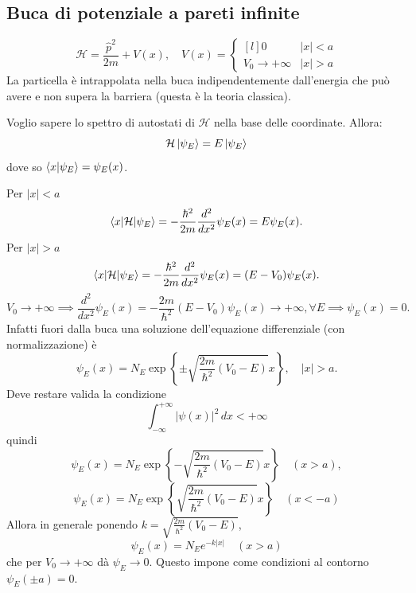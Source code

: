 \subsection{Buca di potenziale a pareti infinite}
\[
\mathcal{H} = \frac{\hat{p}^2}{2m} + V(x), \quad V(x) = \left\{ \begin{matrix*}[l]
0 & |x| < a \\
V_0 \to +\infty & |x| > a
\end{matrix*} \right.
\]
La particella è intrappolata nella buca indipendentemente dall'energia che può avere e non supera la barriera (questa è la teoria classica).

\bigskip
\noindent
Voglio sapere lo spettro di autostati di \( \mathcal{H} \) nella base delle coordinate. Allora:
\[
\mathcal{H} \ket{\psi_E} = E \ket{\psi_E}
\]
dove so \( \braket{x|\psi_E} = \psi_E(x) \).

\bigskip
\noindent
Per \( |x| < a \)
\[
\braket{x|\mathcal{H}|\psi_E} = - \frac{\hbar^2}{2m} \frac{d^2}{dx^2} \psi_E(x) = E \psi_E(x).
\]
Per \( |x| > a \)
\[
\braket{x|\mathcal{H}|\psi_E} = - \frac{\hbar^2}{2m} \frac{d^2}{dx^2} \psi_E(x) = (E - V_0) \psi_E(x).
\]
\[
V_0 \to +\infty \implies \frac{d^2}{dx^2} \psi_E(x) = -\frac{2m}{\hbar^2} (E - V_0) \psi_E(x) \to +\infty, \forall E \implies \psi_E(x) = 0.
\]
Infatti fuori dalla buca una soluzione dell'equazione differenziale (con normalizzazione) è
\[
\psi_E(x) = N_E \exp \left\{ \pm \sqrt{\frac{2m}{\hbar^2}(V_0 - E)} x \right\}, \quad |x| > a.
\]
Deve restare valida la condizione
\[
\int_{-\infty}^{+\infty} |\psi(x)|^2 \, dx < +\infty
\]
quindi
\[
\psi_E(x) = N_E \exp \left\{ -\sqrt{\frac{2m}{\hbar^2}(V_0 - E)} x \right\} \quad (x > a),
\]
\[
\psi_E(x) = N_E \exp \left\{ \sqrt{\frac{2m}{\hbar^2}(V_0 - E)} x \right\} \quad (x < -a)
\]
Allora in generale ponendo \( k = \sqrt{\frac{2m}{\hbar^2}(V_0 - E)} \),
\[
\psi_E(x) = N_E e^{-k |x|} \quad (x > a)
\]
che per \( V_0 \to +\infty \) dà \( \psi_E \to 0 \). Questo impone come condizioni al contorno \( \psi_E(\pm a) = 0 \).


